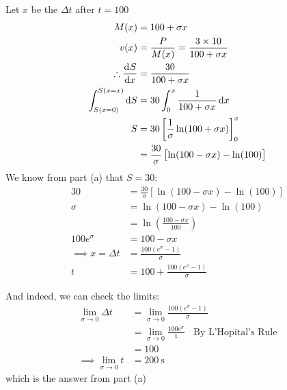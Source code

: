 \documentclass[11pt]{exam}
\begin{document}
\begin{questions}
{\begin{parts}
				\begin{solution}
					\footnotesize
					\begin{multicols}{2}
						Let $x$ be the $\Delta t$ after $t = 100$
						\begin{align*}
						M(x) &= 100 + \sigma x \\
						v(x) &= \frac{P}{M(x)} = \frac{3 \times 10}{100 + \sigma x}\\
						\therefore \dod{S}{x} &= \frac{30}{100 + \sigma x} \\ 
						\int_{S(x = 0)}^{S(x = x)} \dif S &= 30 \int_{0}^{x} \frac{1}{100 + \sigma x} \dif x \\
						S &= 30 \left[\frac{1}{\sigma}\ln(100+\sigma x)\right]^{x}_{0} \\
						&= \frac{30}{\sigma} \left[\ln(100 - \sigma x) - \ln(100)\right] 
						\end{align*}
						We know from part (a) that $S = 30$:
						\begin{align*}
							30 &= \frac{30}{\sigma} \left[\ln(100 - \sigma x) - \ln(100)\right] \\
							\sigma &= \ln(100 - \sigma x) - \ln(100) \\
							&= \ln\left(\frac{100 - \sigma x}{100}\right) \\ 
							100e^\sigma &= 100 - \sigma x \\
							\implies x = \Delta t &= \frac{100\left(e^{\sigma} - 1\right)}{\sigma} \\ 
							t &= 100 + \frac{100\left(e^{\sigma} - 1\right)}{\sigma}
						\end{align*}
					\end{multicols}
				And indeed, we can check the limits:
				\begin{align*}
					\lim_{\sigma\to 0} \Delta t &= \lim_{\sigma\to 0} \frac{100\left(e^{\sigma} - 1\right)}{\sigma} \\
					&= \lim_{\sigma\to 0} \frac{100e^{\sigma}}{1} ~~~~ \text{By L'Ho\^pital's Rule}\\
					&= 100 \\
					\implies \lim_{\sigma\to 0} t &= \SI{200}{\second}
				\end{align*}
				which is the answer from part (a)
				\end{solution}
			\end{parts}
		}
		
		
	\end{questions}
	\pagebreak
\end{document}
